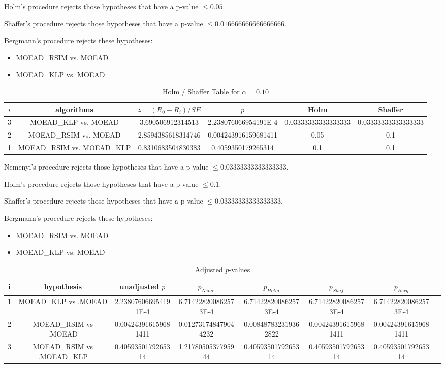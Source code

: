 \documentclass[a4paper,10pt]{article}
\begin{document}
\begin{landscape}
Holm's procedure rejects those hypotheses that have a p-value $\le0.05$.


Shaffer's procedure rejects those hypotheses that have a p-value $\le0.016666666666666666$.


Bergmann's procedure rejects these hypotheses:


\begin{itemize}


\item MOEAD_RSIM vs. MOEAD
\item MOEAD_KLP vs. MOEAD
\end{itemize}


\begin{table}[!htp]
\centering\tiny
\caption{Holm / Shaffer Table for $\alpha=0.10$}
\begin{tabular}{cccccc}
$i$&algorithms&$z=(R_0 - R_i)/SE$&$p$&Holm&Shaffer\\
\hline
3&MOEAD_KLP vs. MOEAD&3.690506912314513&2.238076066954191E-4&0.03333333333333333&0.03333333333333333\\
2&MOEAD_RSIM vs. MOEAD&2.8594385618314746&0.004243916159681411&0.05&0.1\\
1&MOEAD_RSIM vs. MOEAD_KLP&0.8310683504830383&0.4059350179265314&0.1&0.1\\
\hline
\end{tabular}
\end{table}
Nemenyi's procedure rejects those hypotheses that have a p-value $\le0.03333333333333333$.


Holm's procedure rejects those hypotheses that have a p-value $\le0.1$.


Shaffer's procedure rejects those hypotheses that have a p-value $\le0.03333333333333333$.


Bergmann's procedure rejects these hypotheses:


\begin{itemize}


\item MOEAD_RSIM vs. MOEAD
\item MOEAD_KLP vs. MOEAD
\end{itemize}


\begin{table}[!htp]
\centering\tiny
\caption{Adjusted $p$-values}
\begin{tabular}{cccccccc}
i&hypothesis&unadjusted $p$&$p_{Neme}$&$p_{Holm}$&$p_{Shaf}$&$p_{Berg}$\\
\hline
1&MOEAD_KLP vs .MOEAD&2.238076066954191E-4&6.714228200862573E-4&6.714228200862573E-4&6.714228200862573E-4&6.714228200862573E-4\\
2&MOEAD_RSIM vs .MOEAD&0.004243916159681411&0.012731748479044232&0.008487832319362822&0.004243916159681411&0.004243916159681411\\
3&MOEAD_RSIM vs .MOEAD_KLP&0.4059350179265314&1.2178050537795944&0.4059350179265314&0.4059350179265314&0.4059350179265314\\
\hline
\end{tabular}
\end{table}

\end{landscape}
\end{document}

